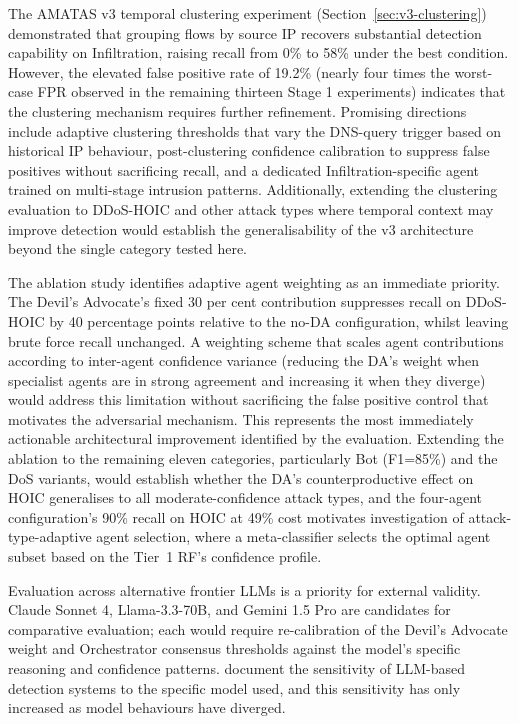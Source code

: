The AMATAS v3 temporal clustering experiment (Section~\ref{sec:v3-clustering}) demonstrated that grouping flows by source IP recovers substantial detection capability on Infiltration, raising recall from 0\% to 58\% under the best condition. However, the elevated false positive rate of 19.2\% (nearly four times the worst-case FPR observed in the remaining thirteen Stage 1 experiments) indicates that the clustering mechanism requires further refinement. Promising directions include adaptive clustering thresholds that vary the DNS-query trigger based on historical IP behaviour, post-clustering confidence calibration to suppress false positives without sacrificing recall, and a dedicated Infiltration-specific agent trained on multi-stage intrusion patterns. Additionally, extending the clustering evaluation to DDoS-HOIC and other attack types where temporal context may improve detection would establish the generalisability of the v3 architecture beyond the single category tested here.

The ablation study identifies adaptive agent weighting as an immediate priority. The Devil's Advocate's fixed 30 per cent contribution suppresses recall on DDoS-HOIC by 40 percentage points relative to the no-DA configuration, whilst leaving brute force recall unchanged. A weighting scheme that scales agent contributions according to inter-agent confidence variance (reducing the DA's weight when specialist agents are in strong agreement and increasing it when they diverge) would address this limitation without sacrificing the false positive control that motivates the adversarial mechanism. This represents the most immediately actionable architectural improvement identified by the evaluation. Extending the ablation to the remaining eleven categories, particularly Bot (F1=85\%) and the DoS variants, would establish whether the DA's counterproductive effect on HOIC generalises to all moderate-confidence attack types, and the four-agent configuration's 90\% recall on HOIC at 49\% cost motivates investigation of attack-type-adaptive agent selection, where a meta-classifier selects the optimal agent subset based on the Tier~1 RF's confidence profile.

Evaluation across alternative frontier LLMs is a priority for external validity. Claude Sonnet 4, Llama-3.3-70B, and Gemini 1.5 Pro are candidates for comparative evaluation; each would require re-calibration of the Devil's Advocate weight and Orchestrator consensus thresholds against the model's specific reasoning and confidence patterns. \textcite{Ferrag2020} document the sensitivity of LLM-based detection systems to the specific model used, and this sensitivity has only increased as model behaviours have diverged.


